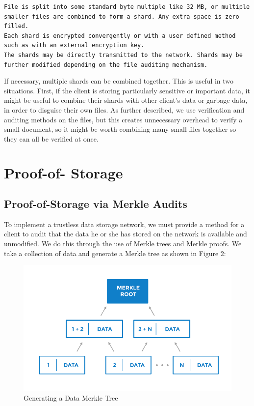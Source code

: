 \documentclass[a4paper,10pt]{article}
\begin{document}
\begin{lstlisting}
File is split into some standard byte multiple like 32 MB, or multiple smaller files are combined to form a shard. Any extra space is zero filled.
Each shard is encrypted convergently or with a user defined method such as with an external encryption key.
The shards may be directly transmitted to the network. Shards may be further modified depending on the file auditing mechanism.
\end{lstlisting}

If necessary, multiple shards can be combined together. This is useful in two situations. First, if the client is storing particularly sensitive or important data, it might be useful to combine their shards with other client’s data or garbage data, in order to disguise their own files. As further described, we use verification and auditing methods on the files, but this creates unnecessary overhead to verify a small document, so it might be worth combining many small files together so they can all be verified at once.



\section{Proof-of- Storage}
\subsection{Proof-of-Storage via Merkle Audits}

To implement a trustless data storage network, we must provide a method for a client to audit that the data he or she has stored on the network is available and unmodified. We do this through the use of Merkle trees \cite{2} and Merkle proofs. We take a collection of data and generate a Merkle tree as shown in Figure 2:\\

\begin{figure}[h!]
\centering
\includegraphics[width=\linewidth]{2}
\caption{Generating a Data Merkle Tree}
\end{figure}
\end{document}
